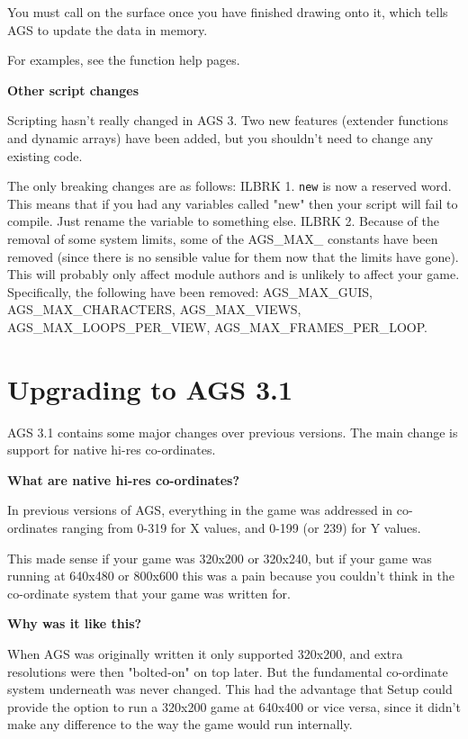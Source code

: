 You must call  on the surface once you have
finished drawing onto it, which tells AGS to update the data in memory.

For examples, see the  function
help pages.

\bf{Other script changes}

Scripting hasn't really changed in AGS 3. Two new features (extender functions
and dynamic arrays) have been added, but you shouldn't need to change any
existing code.

The only breaking changes are as follows: ILBRK
1. \verb$new$ is now a reserved word. This means that if you had any variables
called "new" then your script will fail to compile. Just rename the variable
to something else. ILBRK
2. Because of the removal of some system limits, some of the AGS_MAX_ constants
have been removed (since there is no sensible value for them now that the limits
have gone). This will probably only affect module authors and is unlikely to
affect your game. Specifically, the following have been removed: AGS_MAX_GUIS,
AGS_MAX_CHARACTERS, AGS_MAX_VIEWS, AGS_MAX_LOOPS_PER_VIEW, AGS_MAX_FRAMES_PER_LOOP.


\chapter{Upgrading to AGS 3.1}\label{UpgradeTo31}%

AGS 3.1 contains some major changes over previous versions. The main change
is support for native hi-res co-ordinates.

\bf{What are native hi-res co-ordinates?}

In previous versions of AGS, everything in the game was addressed in co-ordinates
ranging from 0-319 for X values, and 0-199 (or 239) for Y values.

This made sense if your game was 320x200 or 320x240, but if your game was running
at 640x480 or 800x600 this was a pain because you couldn't think in the co-ordinate
system that your game was written for.

\bf{Why was it like this?}

When AGS was originally written it only supported 320x200, and extra resolutions
were then "bolted-on" on top later. But the fundamental co-ordinate system underneath
was never changed. This had the advantage that Setup could provide the option to
run a 320x200 game at 640x400 or vice versa, since it didn't make any difference
to the way the game would run internally.

